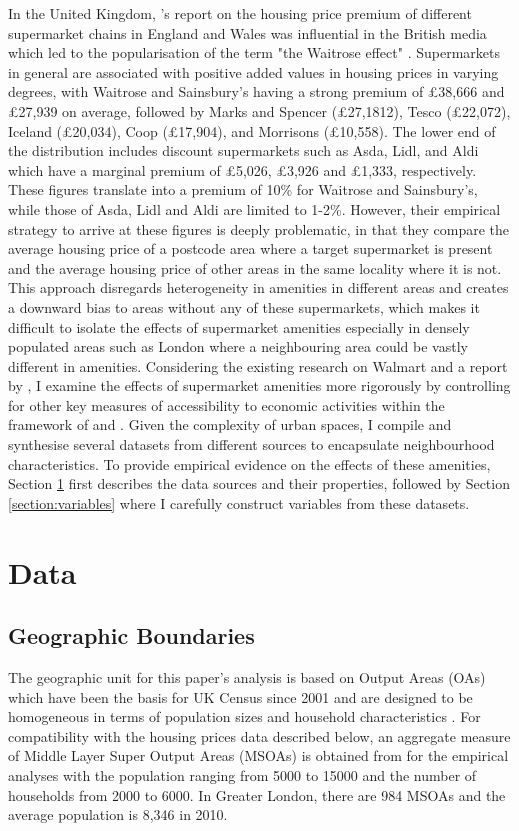 \documentclass{article}
\begin{document}
In the United Kingdom, \citet{LloydsBank2016LivingHome}'s report on the housing price premium of different supermarket chains in England and Wales was influential in the British media which led to the popularisation of the term "the Waitrose effect" \citep{TheIndependent2017WaitrosePounds}. Supermarkets in general are associated with positive added values in housing prices in varying degrees, with Waitrose and Sainsbury's having a strong premium of £38,666 and £27,939 on average, followed by Marks and Spencer (£27,1812), Tesco (£22,072), Iceland (£20,034), Coop (£17,904), and Morrisons (£10,558). The lower end of the distribution includes discount supermarkets such as Asda, Lidl, and Aldi which have a marginal premium of £5,026, £3,926 and £1,333, respectively. These figures translate into a premium of 10\% for Waitrose and Sainsbury's, while those of Asda, Lidl and Aldi are limited to 1-2\%. However, their empirical strategy to arrive at these figures is deeply problematic, in that they compare the average housing price of a postcode area where a target supermarket is present and the average housing price of other areas in the same locality where it is not. This approach disregards heterogeneity in amenities in different areas and creates a downward bias to areas without any of these supermarkets, which makes it difficult to isolate the effects of supermarket amenities especially in densely populated areas such as London where a neighbouring area could be vastly different in amenities. Considering the existing research on Walmart and a report by \citet{LloydsBank2016LivingHome}, I examine the effects of supermarket amenities more rigorously by controlling for other key measures of accessibility to economic activities within the framework of \citet{AlonsoWilliam1964Lalu} and \citet{Rosen1984}. Given the complexity of urban spaces, I compile and synthesise several datasets from different sources to encapsulate neighbourhood characteristics. To provide empirical evidence on the effects of these amenities, Section \ref{section:data} first describes the data sources and their properties, followed by Section \ref{section:variables} where I carefully construct variables from these datasets.


\section{Data} \label{section:data}
\subsection{Geographic Boundaries} \label{subsection:boundaries}
The geographic unit for this paper's analysis is based on Output Areas (OAs) which have been the basis for UK Census since 2001 and are designed to be homogeneous in terms of population sizes and household characteristics \citep{OfficeforNationalStatistics2019CensusGeography}. For compatibility with the housing prices data described below, an aggregate measure of Middle Layer Super Output Areas (MSOAs) is obtained from \citet{LondonDatastore2015LSOAAtlas} for the empirical analyses with the population ranging from 5000 to 15000 and the number of households from 2000 to 6000. In Greater London, there are 984 MSOAs and the average population is 8,346 in 2010.
\end{document}
